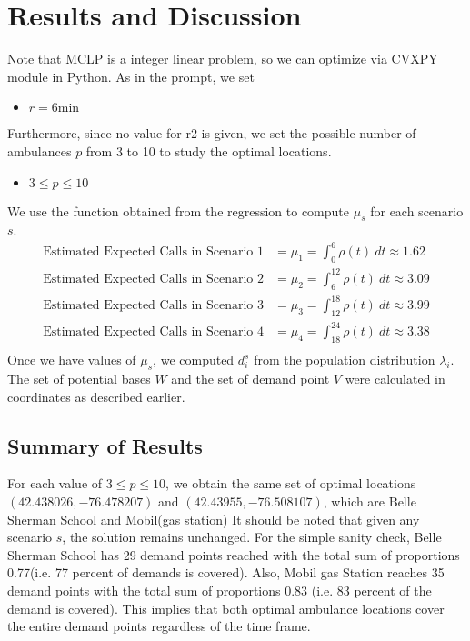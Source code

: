 \documentclass{article}
\begin{document}
\section{Results and Discussion}
Note that MCLP is a integer linear problem, so we can optimize via CVXPY \cite{cvxpy} module in Python. As in the prompt, we set
\begin{itemize}
    \item $r = 6 \text{min}$
\end{itemize}
Furthermore, since no value for r2 is given, we set the possible number of ambulances $p$ from 3 to 10 to study the optimal locations.
\begin{itemize}
    \item $3\leq p \leq10$
\end{itemize}
We use the function obtained from the regression to compute $\mu_s$ for each scenario $s$.
\begin{align*}
\text{Estimated Expected Calls in Scenario 1} &=\mu_1 = \int_{0 } ^{6} \rho(t) \ dt \approx 1.62 \\
\text{Estimated Expected Calls in Scenario 2} &=\mu_2 = \int_{6 } ^{12} \rho(t) \ dt \approx 3.09 \\
\text{Estimated Expected Calls in Scenario 3} &=\mu_3 = \int_{12 } ^{18} \rho(t) \ dt \approx 3.99 \\
\text{Estimated Expected Calls in Scenario 4} &=\mu_4 = \int_{18} ^{24} \rho(t) \ dt \approx 3.38 \\
\end{align*}
Once we have values of $\mu_s$, we computed $d_i^s$ from the population distribution $\lambda_i$. The set of potential bases $W$ and the set of demand point $V$ were calculated in coordinates as described earlier.
\subsection{Summary of Results}
For each value of $3\leq p \leq 10$, we obtain the same set of optimal locations $(42.438026,-76.478207)$ and $(42.43955,-76.508107)$, which are Belle Sherman School and Mobil(gas station) It should be noted that given any scenario $s$, the solution remains unchanged. For the simple sanity check, Belle Sherman School has 29 demand points reached with the total sum of proportions 0.77(i.e. 77 percent of demands is covered). Also, Mobil gas Station reaches 35 demand points with the total sum of proportions 0.83 (i.e. 83 percent of the demand is covered). This implies that both optimal ambulance locations cover the entire demand points regardless of the time frame.
\end{document}
